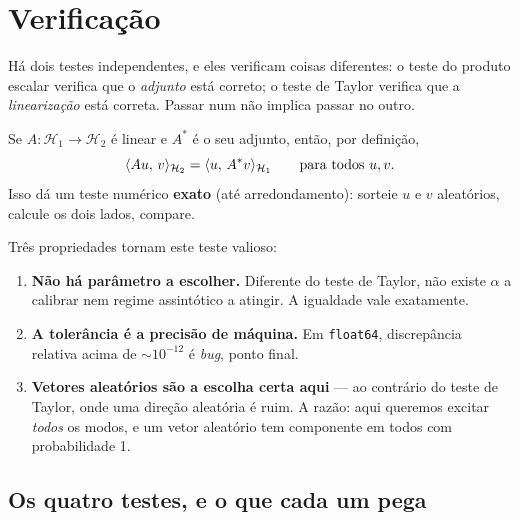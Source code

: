 \documentclass[11pt,a4paper,oneside]{report}
\begin{document}
\chapter{Verifica\c{c}\~ao}
\label{cap:verificacao}

\begin{ideia}
H\'a dois testes independentes, e eles verificam coisas diferentes: o teste do
produto escalar verifica que o \emph{adjunto} est\'a correto; o teste de
Taylor verifica que a \emph{lineariza\c{c}\~ao} est\'a correta. Passar num
n\~ao implica passar no outro.
\end{ideia}

\begin{matematica}
Se $A:\mathcal{H}_1\to\mathcal{H}_2$ \'e linear e $A^{*}$ \'e o seu adjunto,
ent\~ao, por defini\c{c}\~ao,
\[
\langle A u,\,v\rangle_{\mathcal{H}_2} = \langle u,\,A^{*}v\rangle_{\mathcal{H}_1}
\qquad\text{para todos } u, v .
\]
Isso d\'a um teste num\'erico \textbf{exato} (at\'e arredondamento): sorteie
$u$ e $v$ aleat\'orios, calcule os dois lados, compare.

Tr\^es propriedades tornam este teste valioso:
\begin{enumerate}[leftmargin=*, itemsep=1pt]
\item \textbf{N\~ao h\'a par\^ametro a escolher.} Diferente do teste de
Taylor, n\~ao existe $\alpha$ a calibrar nem regime assint\'otico a atingir. A
igualdade vale exatamente.
\item \textbf{A toler\^ancia \'e a precis\~ao de m\'aquina.} Em
\texttt{float64}, discrep\^ancia relativa acima de $\sim10^{-12}$ \'e
\emph{bug}, ponto final.
\item \textbf{Vetores aleat\'orios s\~ao a escolha certa aqui} --- ao
contr\'ario do teste de Taylor, onde uma dire\c{c}\~ao aleat\'oria \'e ruim.
A raz\~ao: aqui queremos excitar \emph{todos} os modos, e um vetor aleat\'orio
tem componente em todos com probabilidade 1.
\end{enumerate}
\end{matematica}

\section{Os quatro testes, e o que cada um pega}
\end{document}
